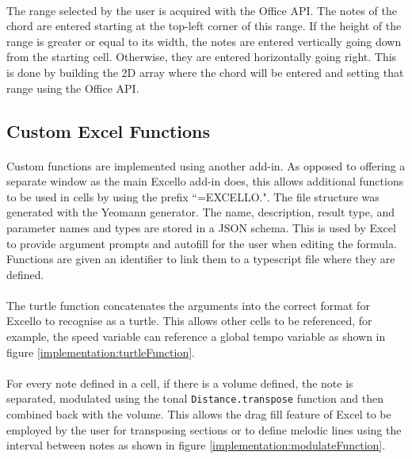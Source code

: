 \paragraph{} The range selected by the user is acquired with the Office API. The notes of the chord are entered starting at the top-left corner of this range. If the height of the range is greater or equal to its width, the notes are entered vertically going down from the starting cell. Otherwise, they are entered horizontally going right. This is done by building the 2D array where the chord will be entered and setting that range using the Office API.

\subsection{Custom Excel Functions}

\paragraph{} Custom functions are implemented using another add-in. As opposed to offering a separate window as the main Excello add-in does, this allows additional functions to be used in cells by using the prefix ``=EXCELLO.". The file structure was generated with the Yeomann generator. The name, description, result type, and parameter names and types are stored in a JSON schema. This is used by Excel to provide argument prompts and autofill for the user when editing the formula. Functions are given an identifier to link them to a typescript file where they are defined.

\paragraph{} The turtle function concatenates the arguments into the correct format for Excello to recognise as a turtle. This allows other cells to be referenced, for example, the speed variable can reference a global tempo variable as shown in figure \ref{implementation:turtleFunction}.

\paragraph{} For every note defined in a cell, if there is a volume defined, the note is separated, modulated using the tonal \texttt{Distance.transpose} function and then combined back with the volume. This allows the drag fill feature of Excel to be employed by the user for transposing sections or to define melodic lines using the interval between notes as shown in figure \ref{implementation:modulateFunction}.

